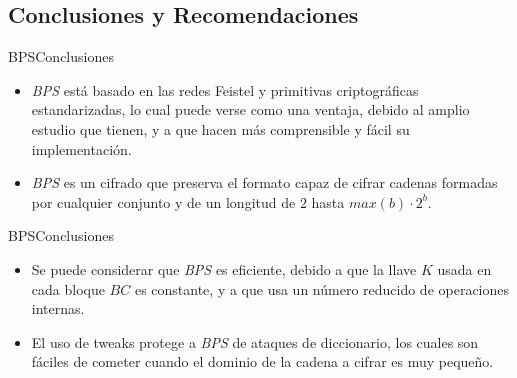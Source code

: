 %
%

\subsection{Conclusiones y Recomendaciones}

\begin{frame}{BPS}{Conclusiones}

  \begin{itemize}
    \item \textit{BPS} está basado en las redes Feistel y primitivas 
      criptográficas estandarizadas, lo cual puede verse como una ventaja, 
      debido al amplio estudio que tienen, y a que hacen más comprensible 
      y fácil su implementación.
    
    \item \textit{BPS} es un cifrado que preserva el formato capaz de cifrar 
      cadenas formadas por cualquier conjunto y de un longitud de $2$ hasta 
      $max(b) \cdot 2^{b}$.
  \end{itemize}
  
\end{frame}

\begin{frame}{BPS}{Conclusiones}

  \begin{itemize}
    \item Se puede considerar que \textit{BPS} es eficiente, debido a que la 
      llave $K$ usada en cada bloque $BC$ es constante, y a que usa un número 
      reducido de operaciones internas.
    
    \item El uso de tweaks protege a \textit{BPS} de ataques de diccionario, 
      los cuales son fáciles de cometer cuando el dominio de la cadena a 
      cifrar es muy pequeño.
  \end{itemize}
  
\end{frame}

